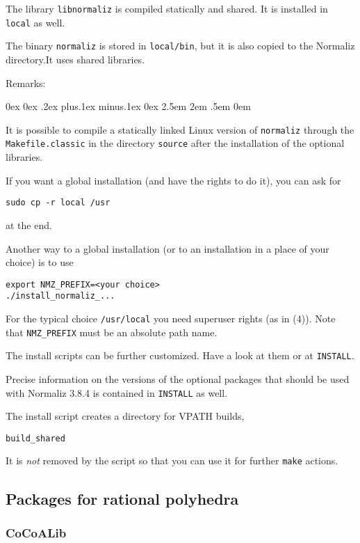 \documentclass[12pt,a4paper]{scrartcl}
\newcounter{listi}
\newcommand{\stdli}{ \topsep0ex \partopsep0ex %
\parsep.2ex plus.1ex minus.1ex \itemsep0ex%
\leftmargin2.5em \labelwidth2em \labelsep.5em \rightmargin0em}%
\newenvironment{arab}{\begin{list}{\textup{(\arabic{listi})}}%
	{\usecounter{listi}\stdli}}{\end{list}}
\theoremstyle{definition}
\def\ttt{\texttt}
\def\version{3.8.4}
\begin{document}
The library \verb|libnormaliz| is compiled statically and shared. It is installed in \verb|local| as well. 

The binary \verb|normaliz| is stored in \verb|local/bin|, but it is also copied to the Normaliz directory.It uses shared libraries.

Remarks:
\begin{arab}
\item It is possible to compile a statically linked Linux version of  \verb|normaliz|  through the \verb|Makefile.classic| in the directory \verb|source| after the installation of the optional libraries.

\item If you want a global installation (and have the rights to do it), you can ask for
\begin{Verbatim}
sudo cp -r local /usr
\end{Verbatim}
at the end.

\item Another way to a global installation (or to an installation in a place of your choice) is to use
\begin{Verbatim}
export NMZ_PREFIX=<your choice>  
./install_normaliz_...
\end{Verbatim}

For the typical choice \verb|/usr/local| you need superuser rights (as in (4)). Note that \verb|NMZ_PREFIX| must be an absolute path name.

\item The install scripts can be further customized. Have a look at them or at \verb|INSTALL|.

\item Precise information on the versions of the optional packages that should be used with Normaliz \version{} is contained in \verb|INSTALL| as well.

\item The install script creates a directory for VPATH builds,
\begin{center}
\ttt{build\_shared}
\end{center}
It is \emph{not} removed by the script so that you can use it for further \ttt{make} actions.
\end{arab}

\subsection{Packages for rational polyhedra}

\subsubsection{CoCoALib}
\end{document}
